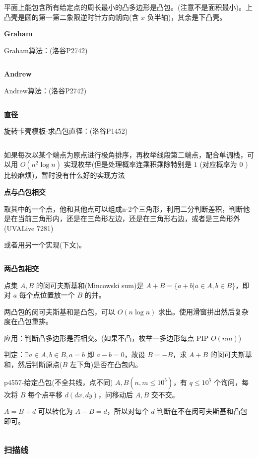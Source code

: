 \documentclass[twocolumn,10pt]{ctexart}
\makeatletter
\newcommand{\hfive}[1]{\par\addvspace{6pt}\@afterindentfalse
  {\noindent\bfseries\normalsize #1}\par\nobreak\vspace{2pt}}
\makeatother
\begin{document}
平面上能包含所有给定点的周长最小的凸多边形是凸包。(注意不是面积最小)。上凸壳是圆的第一第二象限逆时针方向朝向(含 $x$ 负半轴)，其余是下凸壳。

\hfive{Graham}

Graham算法：(洛谷P2742)

\inputminted{cpp}{code/p2742_convex_hull.cpp}

\hfive{Andrew}

Andrew算法：(洛谷P2742)

\inputminted{cpp}{code/p2742_convex_hull2.cpp}

\hfive{直径}

旋转卡壳模板-求凸包直径：(洛谷P1452)

\inputminted{cpp}{code/p1452_rotating_calipers.cpp}

如果每次以某个端点为原点进行极角排序，再枚举线段第二端点，配合单调栈，可以用 $O(n^2\log n)$ 实现枚举(但是处理概率连乘积乘除特别是 $1$ (对应概率为 $0$ )比较麻烦)，暂时没有什么好的实现方法

\hfive{点与凸包相交}

取其中的一个点，他和其他点可以组成n-2个三角形，利用二分判断差积，判断他是在当前三角形内，还是在三角形左边，还是在三角形右边，或者是三角形外 (UVALive 7281)

或者用另一个实现(下文)。

\inputminted{cpp}{code/ext_015.cpp}

\hfive{两凸包相交}

点集 $A,B$ 的闵可夫斯基和(Mincowski sum)是 $A+B=\{a+b|a\in A,b\in B\}$，即对 $a$ 每个点位置放一个 $B$ 的并。

两凸包的闵可夫斯基和是凸包，可以 $O(n\log n)$ 求出。使用滑窗拼出然后复杂度在凸包重排。

应用：判断凸多边形是否相交。(如果不凸，枚举一多边形每点 PIP $O(nm)$)

判定：$\exists a\in A,b\in B,a=b$ 即 $a-b=0$，故设 $B=-B$，求 $A+B$ 的闵可夫斯基和，然后判断原点($B$ 左下角)是否在凸包内。

\begin{notebox}
p4557-给定凸包(不全共线，点不同) $A,B(n,m\le 10^5)$，有 $q\le10^5$ 个询问，每次将 $B$ 每个点平移 $d(dx,dy)$，问移动后 $A,B$ 交不交。
\end{notebox}

$A=B+d$ 可以转化为 $A-B=d$，所以对每个 $d$ 判断在不在闵可夫斯基和凸包即可。

\inputminted{cpp}{code/p4557_convex_hull_intersect.cpp}

\subsubsection{扫描线}
\end{document}
